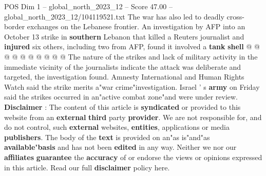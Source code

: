 \begin{textsample}{POS Dim 1 – global\_north\_2023\_12 – Score 47.00 – global\_north\_2023\_12/104119521.txt}
The war has also led to deadly cross-border exchanges on the Lebanese frontier.
An investigation by AFP into an October 13 strike in \textbf{southern} Lebanon that killed a Reuters journalist and \textbf{injured} six others, including two from AFP, found it involved a \textbf{tank} \textbf{shell} @ @ @ @ @ @ @ @ @ @ The nature of the strikes and lack of military activity in the immediate vicinity of the journalists indicate the attack was deliberate and targeted, the investigation found.
Amnesty International and Human Rights Watch said the strike merits a"war crime"investigation.
Israel ' s \textbf{army} on Friday said the strikes occurred in an"active combat zone"and were under review. \textbf{Disclaimer} : The content of this article is \textbf{syndicated} or provided to this website from an \textbf{external} \textbf{third} party \textbf{provider}.
We are not responsible for, and do not control, such \textbf{external} websites, \textbf{entities}, applications or media \textbf{publishers}.
The body of the \textbf{text} is provided on an"as is"and"as \textbf{available}"\textbf{basis} and has not been \textbf{edited} in any way.
Neither we nor our \textbf{affiliates} \textbf{guarantee} the \textbf{accuracy} of or endorse the views or opinions expressed in this article.
Read our full \textbf{disclaimer} policy here.

\end{textsample}
